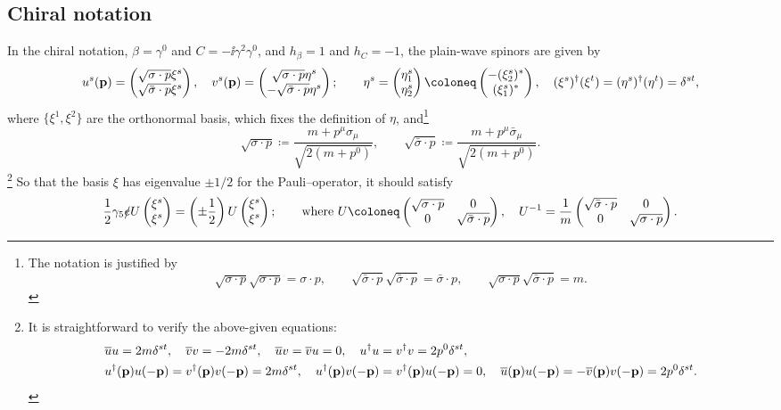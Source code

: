 \documentclass[CheatSheet]{subfiles}
\begin{document}
\subsection{Chiral notation}
In the chiral notation, $\beta=\gamma^0$ and $C=-\ii\gamma^2\gamma^0$, and $h_\beta=1$ and $h_C=-1$, the plain-wave spinors are given by
\begin{equation}
 u^s(\vc p) = \pmat{\sqrt{\sigma\cdot p}\xi^s\\\sqrt{\bar\sigma\cdot p}\xi^s},\quad
 v^s(\vc p) = \pmat{\sqrt{\sigma\cdot p}\eta^s\\-\sqrt{\bar\sigma\cdot p}\eta^s};\qquad
 \eta^s = \pmat{\eta^s_1\\\eta^s_2} \coloneq  \pmat{-(\xi^s_2)^*\\(\xi^s_1)^*},\quad
(\xi^s)^\dagger(\xi^t) = (\eta^s)^\dagger(\eta^t) = \delta^{st},
\end{equation}
where $\{\xi^1,\xi^2\}$ are the orthonormal basis, which fixes the definition of $\eta$, and\footnote{%
The notation is justified by
\begin{equation*}
\sqrt{\sigma\cdot p}\sqrt{\sigma\cdot p} ={\sigma\cdot p},\qquad
\sqrt{\bar\sigma\cdot p}\sqrt{\bar\sigma\cdot p} ={\bar\sigma\cdot p},\qquad
\sqrt{\sigma\cdot p}\sqrt{\bar\sigma\cdot p}=m.
\end{equation*}}
\begin{equation}
  \sqrt{\sigma\cdot p} \coloneq  \frac{m+p^\mu\sigma_\mu}{\sqrt{2(m+p^0)}},
\qquad
 \sqrt{\bar\sigma\cdot p} \coloneq  \frac{m+p^\mu\bar\sigma_\mu}{\sqrt{2(m+p^0)}}.
\end{equation}
\footnote{It is straightforward to verify the above-given equations:
\begin{align}
&
 \overline u u = 2m\delta^{st},\quad
 \overline v v = -2m\delta^{st},\quad
 \overline u v = \overline v u = 0,\quad
 u^\dagger u = v^\dagger v = 2p^0\delta^{st},\quad
\\&
 u^\dagger({\mathbf{p}})u(-{\mathbf{p}})= v^\dagger({\mathbf{p}})v(-{\mathbf{p}})=2m\delta^{st},\quad
 u^\dagger({\mathbf{p}})v(-{\mathbf{p}})= v^\dagger({\mathbf{p}})u(-{\mathbf{p}})=0,\quad
 \overline u({\mathbf{p}})u(-{\mathbf{p}})= -\overline v({\mathbf{p}})v(-{\mathbf{p}})=2p^0\delta^{st}.
\end{align}
}
So that the basis $\xi$ has eigenvalue $\pm1/2$ for the Pauli--\Lubanski operator, it should satisfy
\begin{equation}
 \frac12 \gamma_5\slashed{e} U \pmat{\xi^s\\\xi^s} = \left(\pm\frac12\right)U\pmat{\xi^s\\\xi^s};\qquad
\text{where~}
 U\coloneq \pmat{\sqrt{\sigma\cdot p} & 0 \\ 0 & \sqrt{\bar\sigma\cdot p}},\quad
 U^{-1}=\frac{1}{m}\pmat{\sqrt{\bar\sigma\cdot p} & 0 \\ 0 & \sqrt{\sigma\cdot p}}.
\end{equation}
\end{document}
